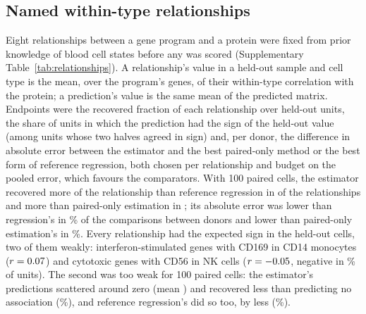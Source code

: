 \begin{table}[h]
\caption{\textbf{One study, one draw, one atlas.} Top: each draw index of the validation test scored on its own (the atlas fixed): paired cells the estimator needed to reach the primary target, the saving over the paired-only envelope (V1; a lower bound when paired-only estimation did not reach the target within 800) and the ratio of the paired cells needed by the best form of reference regression to those needed by the estimator (K2); then 2,000 resamples of donors with one draw index per fold, median and 95\% interval. Bottom: the atlas's patients resampled (ten bootstrap replicates; first draw of paired cells), with the replicate that takes every patient once; then the replicates combined with 200 resamples of donors each. The central 95\% of these nested resamples is a sensitivity summary: ten atlas replicates do not establish nominal coverage over new reference atlases.}
\label{tab:onedraw}
\centering\footnotesize

\end{table}

\subsection*{Named within-type relationships}
Eight relationships between a gene program and a protein were fixed from prior knowledge of blood cell states before any was scored (Supplementary Table~\ref{tab:relationships}). A relationship's value in a held-out sample and cell type is the mean, over the program's genes, of their within-type correlation with the protein; a prediction's value is the same mean of the predicted matrix. Endpoints were the recovered fraction of each relationship over held-out units, the share of units in which the prediction had the sign of the held-out value (among units whose two halves agreed in sign) and, per donor, the difference in absolute error between the estimator and the best paired-only method or the best form of reference regression, both chosen per relationship and budget on the pooled error, which favours the comparators. With 100 paired cells, the estimator recovered more of the relationship than reference regression in \RvRelBetterReg{} of the \RvRelN{} relationships and more than paired-only estimation in \RvRelBetterPo; its absolute error was lower than regression's in \RvRelDonorWinReg\% of the comparisons between donors and lower than paired-only estimation's in \RvRelDonorWinPo\%. Every relationship had the expected sign in the held-out cells, two of them weakly: interferon-stimulated genes with CD169 in CD14 monocytes ($r=0.07$) and cytotoxic genes with CD56 in NK cells ($r=-0.05$, negative in \RvRelSevenTruthShare\% of units). The second was too weak for 100 paired cells: the estimator's predictions scattered around zero (mean \RvRelSevenAtlasPred) and recovered less than predicting no association (\RvRelSevenAtlasRf\%), and reference regression's did so too, by less (\RvRelSevenRegRf\%).

